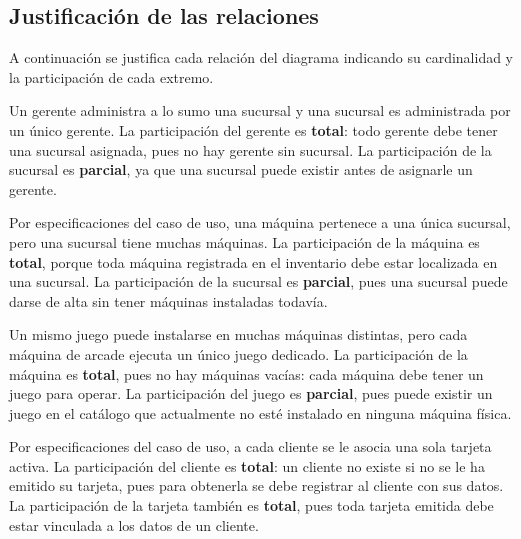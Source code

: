 \documentclass[11pt,letterpaper,spanish]{article}
\begin{document}
\subsection*{Justificación de las relaciones }

A continuación se justifica cada relación del diagrama indicando su cardinalidad y la
participación de cada extremo.

\begin{description}[leftmargin=0pt, style=nextline]

	\item[ADMINISTRAR --- Gerente $\leftrightarrow$ Sucursal \textnormal{(1:1)}]
		Un gerente administra a lo sumo una sucursal y una sucursal es administrada por un
		único gerente. La participación del gerente es \textbf{total}: todo gerente debe
		tener una sucursal asignada, pues no hay gerente sin sucursal. La participación de
		la sucursal es \textbf{parcial}, ya que una sucursal puede existir antes de
		asignarle un gerente.

	\item[PERTENECE --- Máquina $\leftrightarrow$ Sucursal \textnormal{(N:1)}]
		Por especificaciones del caso de uso, una máquina pertenece a una única sucursal,
		pero una sucursal tiene muchas máquinas. La participación de la máquina es
		\textbf{total}, porque toda máquina registrada en el inventario debe estar
		localizada en una sucursal. La participación de la sucursal es \textbf{parcial},
		pues una sucursal puede darse de alta sin tener máquinas instaladas todavía.

	\item[CONTENER --- Máquina $\leftrightarrow$ Juego \textnormal{(N:1)}]
		Un mismo juego puede instalarse en muchas máquinas distintas, pero cada máquina de
		arcade ejecuta un único juego dedicado. La participación de la máquina es
		\textbf{total}, pues no hay máquinas vacías: cada máquina debe tener un juego para
		operar. La participación del juego es \textbf{parcial}, pues puede existir un juego
		en el catálogo que actualmente no esté instalado en ninguna máquina física.

	\item[TENER --- Cliente $\leftrightarrow$ Tarjeta \textnormal{(1:1)}]
		Por especificaciones del caso de uso, a cada cliente se le asocia una sola tarjeta
		activa. La participación del cliente es \textbf{total}: un cliente no existe si no
		se le ha emitido su tarjeta, pues para obtenerla se debe registrar al cliente con
		sus datos. La participación de la tarjeta también es \textbf{total}, pues toda
		tarjeta emitida debe estar vinculada a los datos de un cliente.


\end{description}
\end{document}
